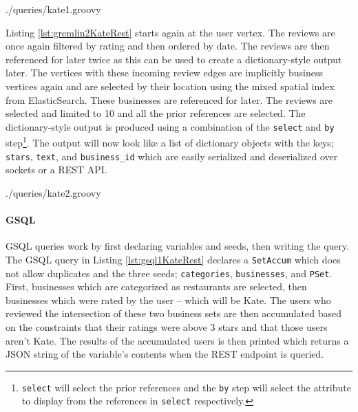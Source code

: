 
{./queries/kate1.groovy}

Listing \ref{lst:gremlin2KateRest} starts again at the user vertex. The reviews are once again filtered by rating and then ordered by date. The reviews are then referenced for later twice as this can be used to create a dictionary-style output later. The vertices with these incoming review edges are implicitly business vertices again and are selected by their location using the mixed spatial index from ElasticSearch. These businesses are referenced for later. The reviews are selected and limited to 10 and all the prior references are selected. The dictionary-style output is produced using a combination of the \texttt{select} and \texttt{by} step\footnote{\texttt{select} will select the prior references and the \texttt{by} step will select the attribute to display from the references in \texttt{select} respectively.}. The output will now look like a list of dictionary objects with the keys; \texttt{stars}, \texttt{text}, and \texttt{business\_id} which are easily serialized and deserialized over sockets or a REST API.


{./queries/kate2.groovy}

\paragraph{GSQL}

GSQL queries work by first declaring variables and seeds, then writing the query. The GSQL query in Listing \ref{lst:gsql1KateRest} declares a \texttt{SetAccum} which does not allow duplicates and the three seeds; \texttt{categories}, \texttt{businesses}, and \texttt{PSet}. First, businesses which are categorized as restaurants are selected, then businesses which were rated by the user -- which will be Kate. The users who reviewed the intersection of these two business sets are then accumulated based on the constraints that their ratings were above 3 stars and that those users aren't Kate. The results of the accumulated users is then printed which returns a JSON string of the variable's contents when the REST endpoint is queried.

